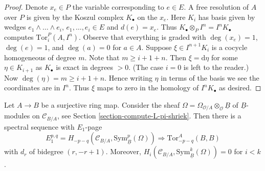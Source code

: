 \begin{proof}
Denote $x_e \in P$ the variable corresponding to $e \in E$.
A free resolution of $A$ over $P$ is given by the Koszul complex
$K_\bullet$ on the $x_e$. Here $K_i$ has basis given by wedges
$e_1 \wedge \ldots \wedge e_i$, $e_1, \ldots, e_i \in E$ and $d(e) = x_e$.
Thus $K_\bullet \otimes_P I^n = I^nK_\bullet$ computes
$\text{Tor}_i^P(A, I^n)$. Observe that everything is graded
with $\deg(x_e) = 1$, $\deg(e) = 1$, and $\deg(a) = 0$ for $a \in A$.
Suppose $\xi \in I^{n + 1}K_i$ is a cocycle homogeneous of degree $m$.
Note that $m \geq i + 1 + n$. Then $\xi = \text{d}\eta$ for some
$\eta \in K_{i + 1}$ as $K_\bullet$ is exact in degrees $ > 0$.
(The case $i = 0$ is left to the reader.)
Now $\deg(\eta) = m \geq i + 1 + n$. Hence writing $\eta$
in terms of the basis we see the coordinates are in $I^n$.
Thus $\xi$ maps to zero in the homology of $I^nK_\bullet$ as desired.
\end{proof}

\begin{theorem}
\label{theorem-quillen-spectral-sequence}
Let $A \to B$ be a surjective ring map. Consider the sheaf
$\Omega = \Omega_{\mathcal{O}/A} \otimes_\mathcal{O} \underline{B}$ of
$\underline{B}$-modules on $\mathcal{C}_{B/A}$, see
Section \ref{section-compute-L-pi-shriek}.
Then there is a spectral sequence with $E_1$-page
$$
E_1^{p, q} =
H_{- p - q}(\mathcal{C}_{B/A}, \text{Sym}^p_{\underline{B}}(\Omega))
\Rightarrow \text{Tor}^A_{- p - q}(B, B)
$$
with $d_r$ of bidegree $(r, -r + 1)$.
Moreover, $H_i(\mathcal{C}_{B/A}, \text{Sym}^k_{\underline{B}}(\Omega)) = 0$
for $i < k$.
\end{theorem}


